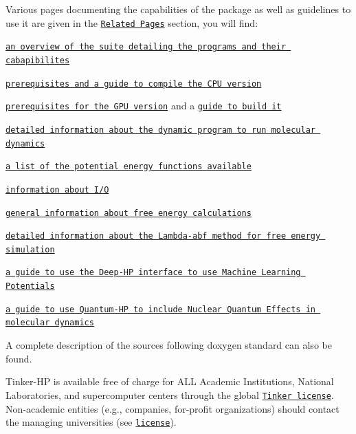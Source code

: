 Various pages documenting the capabilities of the package as well as guidelines to use it are given in the \href{pages.html}{\tt Related Pages} section, you will find\-:
\begin{DoxyItemize}
\item \href{md_binaries_doxygen.html}{\tt an overview of the suite detailing the programs and their cabapibilites}
\item \href{md_Build_CPU.html}{\tt prerequisites and a guide to compile the C\-P\-U version}
\item \href{md_Prerequisites_doxygen.html}{\tt prerequisites for the G\-P\-U version} and a \href{md_Build_GPU.html}{\tt guide to build it}
\item \href{md_dynamic_doxygen.html}{\tt detailed information about the dynamic program to run molecular dynamics}
\item \href{md_potential_doxygen.html}{\tt a list of the potential energy functions available}
\item \href{md_io_doxygen.html}{\tt information about I/\-O}
\item \href{md_free_energy.html}{\tt general information about free energy calculations}
\item \href{md_lambda-abf_doxygen.html}{\tt detailed information about the Lambda-\/abf method for free energy simulation}
\item \href{md_Deep-HP.html}{\tt a guide to use the Deep-\/\-H\-P interface to use Machine Learning Potentials}
\item \href{md_Quantum-HP_doxygen.html}{\tt a guide to use Quantum-\/\-H\-P to include Nuclear Quantum Effects in molecular dynamics}
\end{DoxyItemize}

A complete description of the sources following doxygen standard can also be found.

Tinker-\/\-H\-P is available free of charge for A\-L\-L Academic Institutions, National Laboratories, and supercomputer centers through the global \href{https://dasher.wustl.edu/tinker/downloads/license.pdf}{\tt Tinker license}. Non-\/academic entities (e.\-g., companies, for-\/profit organizations) should contact the managing universities (see \href{license-Tinker.pdf}{\tt license}). 




